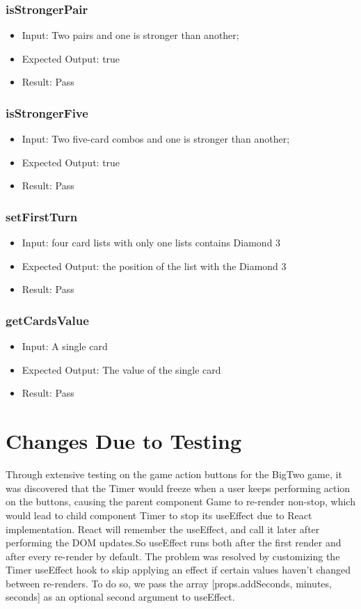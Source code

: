 \documentclass[12pt, titlepage]{article}
\begin{document}
\subsubsection{isStrongerPair}
\begin{itemize}
    \item Input: Two pairs and one is stronger than another;
    \item Expected Output: true
    \item Result: Pass
\end{itemize}

\subsubsection{isStrongerFive}
\begin{itemize}
    \item Input: Two five-card combos and one is stronger than another;
    \item Expected Output: true
    \item Result: Pass
\end{itemize}

\subsubsection{setFirstTurn}
\begin{itemize}
    \item Input: four card lists with only one lists contains Diamond 3
    \item Expected Output: the position of the list with the Diamond 3
    \item Result: Pass
\end{itemize}

\subsubsection{getCardsValue}
\begin{itemize}
    \item Input: A single card
    \item Expected Output: The value of the single card
    \item Result: Pass
\end{itemize}

\section{Changes Due to Testing}

Through extensive testing on the game action buttons for the BigTwo game, it was discovered that the Timer would freeze when a user keeps performing action on the buttons, causing the parent component Game to re-render non-stop, which would lead to child component Timer to stop its useEffect due to React implementation. React will remember the useEffect, and call it later after performing the DOM updates.So useEffect runs both after the first render and after every re-render by default. The problem was resolved by customizing the Timer useEffect hook to skip applying an effect if certain values haven’t changed between re-renders. To do so, we pass the array [props.addSeconds, minutes, seconds] as an optional second argument to useEffect.
\end{document}
